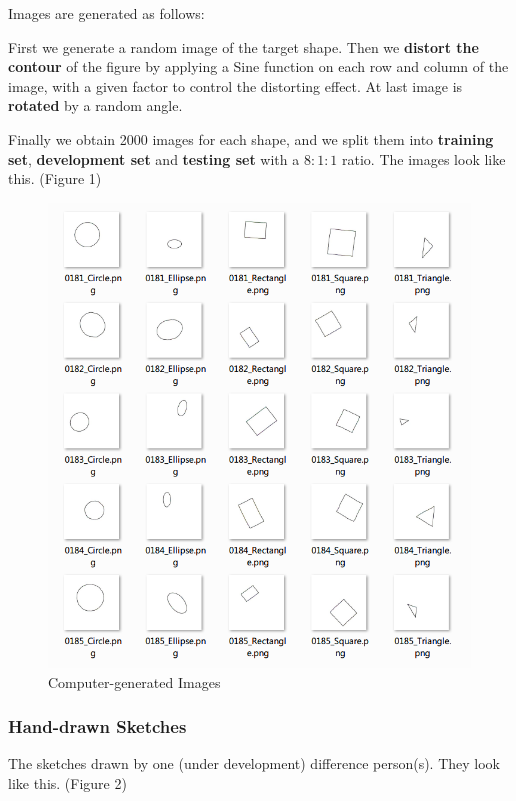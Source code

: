 Images are generated as follows:

First we generate a random image of the target shape. Then we \textbf{distort the contour} of the figure by applying a Sine function on each row and column of the image, with a given factor to control the distorting effect. At last image is \textbf{rotated} by a random angle.

Finally we obtain 2000 images for each shape, and we split them into \textbf{training set}, \textbf{development set} and \textbf{testing set} with a $8:1:1$ ratio.  The images look like this. (Figure 1)

\begin{figure}[ht!]
\includegraphics[]{Figure_1_CG_Image.png}
\caption{Computer-generated Images}
\end{figure}

\subsubsection{Hand-drawn Sketches}

The sketches drawn by one (under development) difference person(s). They look like this. (Figure 2)

